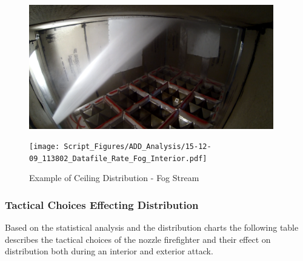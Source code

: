\documentclass[12pt,oneside]{book}
\begin{document}
\begin{figure}[H]
	\centering
	\begin{minipage}[b]{0.45\textwidth}
	\centering
	\includegraphics[width=0.95\textwidth]{Figures/Water_Distribution/Nozzle_Directions/Interior_MidCeiling_Fog.png}
	\end{minipage}
	\begin{minipage}[b]{0.45\textwidth}
	\centering
	\texttt{[image: Script\_Figures/ADD\_Analysis/15-12-09\_113802\_Datafile\_Rate\_Fog\_Interior.pdf]}
	\end{minipage}
	\caption{Example of Ceiling Distribution - Fog Stream}
	\label{fig:Interior_Fog_MidCeiling}
\end{figure}


\subsubsection{Tactical Choices Effecting Distribution}

Based on the statistical analysis and the distribution charts the following table describes the tactical choices of the nozzle firefighter and their effect on distribution both during an interior and exterior attack. 
\end{document}
